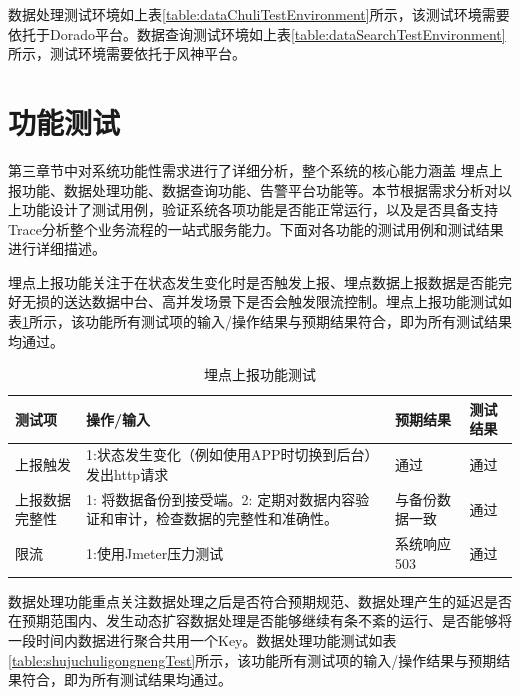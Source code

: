 \begin{longtable}[htbp]
数据处理测试环境如上表\ref{table:dataChuliTestEnvironment}所示，该测试环境需要依托于Dorado平台。数据查询测试环境如上表\ref{table:dataSearchTestEnvironment}所示，测试环境需要依托于风神平台。
\section{功能测试}

第三章节中对系统功能性需求进行了详细分析，整个系统的核心能力涵盖
埋点上报功能、数据处理功能、数据查询功能、告警平台功能等。本节根据需求分析对以上功能设计了测试用例，验证系统各项功能是否能正常运行，以及是否具备支持Trace分析整个业务流程的一站式服务能力。下面对各功能的测试用例和测试结果进行详细描述。

埋点上报功能关注于在状态发生变化时是否触发上报、埋点数据上报数据是否能完好无损的送达数据中台、高并发场景下是否会触发限流控制。埋点上报功能测试如表\ref{table:maidianshangbaoTest}所示，该功能所有测试项的输入/操作结果与预期结果符合，即为所有测试结果均通过。

\begin{table}[h]  
\centering  
\caption{埋点上报功能测试}
\begin{tabular}{|l|p{4cm}|p{3cm}|l|}  
\hline  
\textbf{测试项} & \textbf{操作/输入} & \textbf{预期结果} & \textbf{测试结果} \\ \hline  
上报触发 & 1:状态发生变化（例如使用APP时切换到后台） 发出http请求 & 通过 & 通过 \\ \hline  
上报数据完整性 & 1: 将数据备份到接受端。2: 定期对数据内容验证和审计\cite{吴颖豪2019一种改进的云存储数据完整性验证方法}，检查数据的完整性和准确性。 & 与备份数据一致 & 通过 \\ \hline  
限流 & 1:使用Jmeter压力测试 & 系统响应503 & 通过 \\ \hline  
\end{tabular}  
\label{table:maidianshangbaoTest}
\end{table}

数据处理功能重点关注数据处理之后是否符合预期规范、数据处理产生的延迟是否在预期范围内、发生动态扩容数据处理是否能够继续有条不紊的运行、是否能够将一段时间内数据进行聚合共用一个Key。数据处理功能测试如表\ref{table:shujuchuligongnengTest}所示，该功能所有测试项的输入/操作结果与预期结果符合，即为所有测试结果均通过。



\end{longtable}
